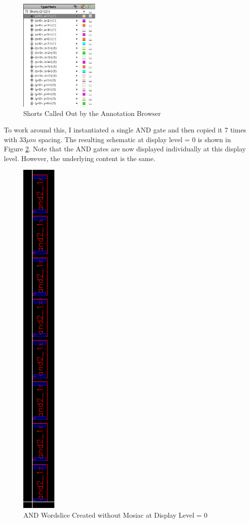 \documentclass{article}
\begin{document}
	\begin{figure}[H]
		\centerline{\includegraphics[width=0.35\textwidth]{and2_1x_8_annotation_shorts.png}}
		\caption{Shorts Called Out by the Annotation Browser}
		\label{fig::and2_1x_8_annotation_shorts}
	\end{figure}
	
	\noindent To work around this, I instantiated a single AND gate and then copied it 7 times with $33{\mu}m$ spacing. The resulting schematic at display level = 0 is shown in Figure \ref{fig::and2_1x_8_layout_overview}. Note that the AND gates are now displayed individually at this display level. However, the underlying content is the same.
	
	\begin{figure}[H]
		\centerline{\includegraphics[height=0.8\textwidth, angle=270]{and2_1x_8_layout_overview.png}}
		\caption{AND Wordslice Created without Mosiac at Display Level = 0}
		\label{fig::and2_1x_8_layout_overview}
	\end{figure}
	
\end{document}
